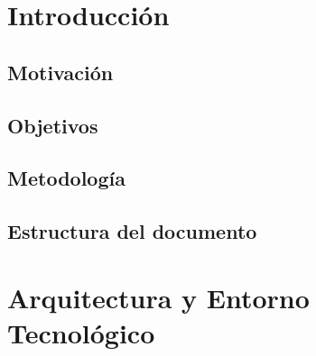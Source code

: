 \documentclass[12pt, a4paper, twoside]{article}
\begin{document}


\clearpage
\setcounter{page}{1}


\newpage


\newpage



\tableofcontents



\section{Introducción}

\subsection{Motivación}

\newpage\cleardoublepage

\subsection{Objetivos}

\newpage\cleardoublepage

\subsection{Metodología}

\newpage\cleardoublepage

\subsection{Estructura del documento}

\newpage\cleardoublepage


\section{Arquitectura y Entorno Tecnológico}

\newpage\cleardoublepage
\end{document}
